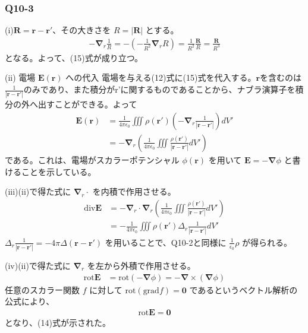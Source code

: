 \documentclass[platex,dvipdfmx,a4paper]{jsarticle}
\newcommand{\vect}[1]{\boldsymbol{#1}}
\begin{document}
  \subsubsection*{Q10-3}
  (i)$\vect{R} = \vect{r} - \vect{r'}$、その大きさを $R = |\vect{R}|$ とする。
  \begin{align*}
    -\vect{\nabla}_r \frac{1}{R} = -\left( -\frac{1}{R^2} \vect{\nabla}_r R \right) = \frac{1}{R^2} \frac{\vect{R}}{R} = \frac{\vect{R}}{R^3}
  \end{align*}
  となる。よって、(15)式が成り立つ。

  (ii) 電場 $\vect{E}(\vect{r})$ への代入
  電場を与える(12)式に(15)式を代入する。$\vect{r}$を含むのは$\frac{1}{|\vect{r}-\vect{r'}|}$のみであり、また積分がr'に関するものであることから、ナブラ演算子を積分の外へ出すことができる。よって
  \begin{align*}
    \vect{E}(\vect{r}) &= \frac{1}{4\pi\epsilon_0} \iiint \rho(\vect{r'}) \left( -\vect{\nabla}_r \frac{1}{|\vect{r}-\vect{r'}|} \right) dV' \\
    &= -\vect{\nabla}_r \left( \frac{1}{4\pi\epsilon_0} \iiint \frac{\rho(\vect{r'})}{|\vect{r}-\vect{r'}|} dV' \right)
  \end{align*}
  である。これは、電場がスカラーポテンシャル $\phi(\vect{r})$ を用いて $\vect{E} = -\vect{\nabla}\phi$ と書けることを示している。

  (iii)(ii)で得た式に $\vect{\nabla}_r \cdot$ を内積で作用させる。
  \begin{align*}
    \text{div} \vect{E} &= -\vect{\nabla}_r \cdot \vect{\nabla}_r \left( \frac{1}{4\pi\epsilon_0} \iiint \frac{\rho(\vect{r'})}{|\vect{r}-\vect{r'}|} dV' \right) \\
    &= -\frac{1}{4\pi\epsilon_0} \iiint \rho(\vect{r'}) \Delta_r \frac{1}{|\vect{r}-\vect{r'}|} dV'
  \end{align*}
  $\Delta_r \frac{1}{|\vect{r}-\vect{r'}|} = -4\pi\Delta(\vect{r}-\vect{r'})$ を用いることで、Q10-2と同様に $\frac{1}{\epsilon_0}\rho$ が得られる。

  (iv)(ii)で得た式に $\vect{\nabla}_r$ を左から外積で作用させる。
  \begin{align*}
    \text{rot} \vect{E} &= \text{rot} (-\vect{\nabla} \phi) = -\vect{\nabla} \times (\vect{\nabla} \phi)
  \end{align*}
  任意のスカラー関数 $f$ に対して $\text{rot}(\text{grad} f) = \vect{0}$ であるというベクトル解析の公式により、
  \begin{align*}
    \text{rot} \vect{E} = \vect{0}
  \end{align*}
  となり、(14)式が示された。
\end{document}
